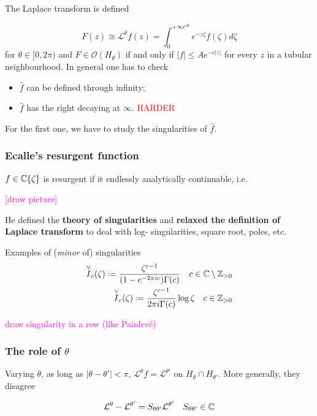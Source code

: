 \documentclass[11pt,a4paper,twoside,leqno,noamsfonts]{amsart}
\numberwithin{equation}{section}
\begin{document}
The Laplace transform is defined 

\begin{equation}
F(z)\cong\mathcal{L}^{\theta}f(z)=\int_0^{+\infty e^{i\theta}}e^{-z\zeta}f(\zeta)d\zeta
\end{equation}
for $\theta\in [0,2\pi)$ and $F\in\mathcal{O}(H_\theta)$ if and only if $|f|\leq Ae^{-c|z|}$ for every $z$ in a tubular neighbourhood. In general one has to check 
\begin{itemize}
\item $\hat{f}$ can be defined through infinity;
\item $\hat{f}$ has the right decaying at $\infty$. \textcolor{red}{HARDER}
\end{itemize}

For the first one, we have to study the singularities of $\hat{f}$. 

\subsubsection{Ecalle's resurgent function}

$f\in\mathbb C\lbrace \zeta\rbrace$ is resurgent if it endlessly analytically continuable, i.e.

\textcolor{magenta}{[draw picture]}

He defined the \textbf{theory of singularities} and \textbf{relaxed the definition of Laplace transform} to deal with log- singularities, square root, poles, etc.

Examples of (\textit{minor} of) singularities 
\begin{align*}
\overset{\vee}{I}_c(\zeta)\defeq\frac{\zeta^{c-1}}{(1-e^{-2\pi ic})\Gamma(c)}\quad c\in\C\setminus\Z_{>0}\\
\overset{\vee}{I}_c(\zeta)\defeq\frac{\zeta^{c-1}}{2\pi i \Gamma(c)}\log\zeta \quad c\in\Z_{>0}
\end{align*}  

\textcolor{magenta}{draw singularity in a row (like Painlev\'e)}

\subsubsection{The role of $\theta$}

Varying $\theta$, as long as $|\theta-\theta'|<\pi$, $\mathcal{L}^\theta f=\mathcal{L}^{\theta'}$ on $H_\theta\cap H_{\theta'}$. More generally, they disagree

\begin{align*}
\mathcal{L}^\theta-\mathcal{L}^{\theta'}=S_{\theta\theta'}\mathcal{L}^{\theta'}\quad S_{\theta\theta'}\in\mathbb C
\end{align*}
\end{document}
